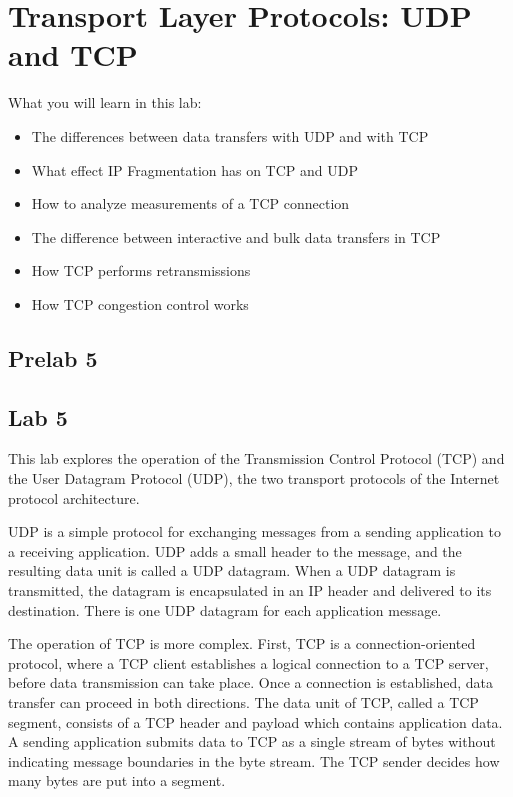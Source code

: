 
\chapter{Transport Layer Protocols: UDP and TCP}

What you will learn in this lab:
\begin{itemize}
	\item The differences between data transfers with UDP and with TCP
	\item What effect IP Fragmentation has on TCP and UDP
	\item How to analyze measurements of a TCP connection
	\item The difference between interactive and bulk data transfers in TCP
	\item How TCP performs retransmissions
	\item How TCP congestion control works
\end{itemize}

\newpage
{}
\section{Prelab 5}\label{sec:prelab5}


\newpage
{}
\section{Lab 5}\label{sec:lab5}

This lab explores the operation of the Transmission Control Protocol (TCP) and the User Datagram Protocol (UDP), the two transport protocols of the Internet protocol architecture.

UDP is a simple protocol for exchanging messages from a sending application to a receiving application. UDP adds a small header to the message, and the resulting data unit is called a UDP datagram. When a UDP datagram is transmitted, the datagram is encapsulated in an IP header and delivered to its destination. There is one UDP datagram for each application message.

The operation of TCP is more complex. First, TCP is a connection-oriented protocol, where a TCP client establishes a logical connection to a TCP server, before data transmission can take place. Once a connection is established, data transfer can proceed in both directions. The data unit of TCP, called a TCP segment, consists of a TCP header and payload which contains application data. A sending application submits data to TCP as a single stream of bytes without indicating message boundaries in the byte stream. The TCP sender decides how many bytes are put into a segment.

